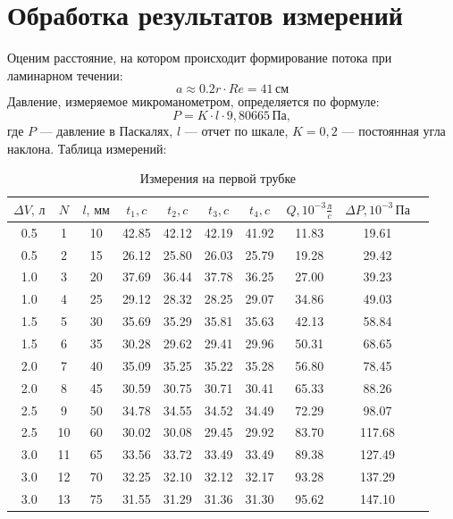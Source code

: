 \documentclass[a4paper, fontsize=14pt]{article}
\begin{document}
\section*{Обработка результатов измерений}
Оценим расстояние, на котором происходит формирование потока при ламинарном течении:
\[
	a \approx 0.2 r \cdot Re = 41\, \text{см}
\]
Давление, измеряемое микроманометром, определяется по формуле:
\[
P=K \cdot l \cdot 9,80665\, \text{Па},
\]
где $P$ --- давление в Паскалях, $l$ --- отчет по шкале, $K=0,2$ --- постоянная угла наклона.
Таблица измерений:\\
\begin{table}[H]

	\centering
	\begin{tabular}{|c|c|c|c|c|c|c|c|c|c|} \hline
  $\Delta V, \, \text{л}$ &   $N$ &   $l,\, \text{мм}$ &     $t_1, c$ &     $t_2, c$ &     $t_3, c$ &     $t_4, c$ &  $ Q, 10^{-3} \frac{\text{л}}{c} $ & $\Delta P, 10^{-3}\, \text{Па}$ \\\hline
  0.5 &   1 &  10 &  42.85 &  42.12 &  42.19 &  41.92 &  11.83 &   19.61 \\\hline
 0.5 &   2 &  15 &  26.12 &  25.80 &  26.03 &  25.79 &  19.28 &   29.42 \\\hline
 1.0 &   3 &  20 &  37.69 &  36.44 &  37.78 &  36.25 &  27.00 &   39.23 \\\hline
  1.0 &   4 &  25 &  29.12 &  28.32 &  28.25 &  29.07 &  34.86 &   49.03 \\\hline
  1.5 &   5 &  30 &  35.69 &  35.29 &  35.81 &  35.63 &  42.13 &   58.84 \\\hline
  1.5 &   6 &  35 &  30.28 &  29.62 &  29.41 &  29.96 &  50.31 &   68.65 \\\hline
  2.0 &   7 &  40 &  35.09 &  35.25 &  35.22 &  35.28 &  56.80 &   78.45 \\\hline
  2.0 &   8 &  45 &  30.59 &  30.75 &  30.71 &  30.41 &  65.33 &   88.26 \\\hline
  2.5 &   9 &  50 &  34.78 &  34.55 &  34.52 &  34.49 &  72.29 &   98.07 \\\hline
  2.5 &  10 &  60 &  30.02 &  30.08 &  29.45 &  29.92 &  83.70 &  117.68 \\\hline
  3.0 &  11 &  65 &  33.56 &  33.72 &  33.49 &  33.49 &  89.38 &  127.49 \\\hline
  3.0 &  12 &  70 &  32.25 &  32.10 &  32.12 &  32.17 &  93.28 &  137.29 \\\hline
  3.0 &  13 &  75 &  31.55 &  31.29 &  31.36 &  31.30 &  95.62 &  147.10 \\\hline
\end{tabular}
		\caption{Измерения на первой трубке}
\end{table}
\end{document}
